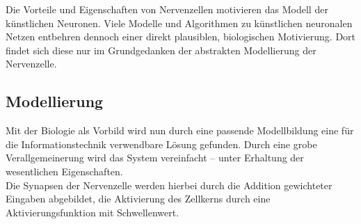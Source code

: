 Die Vorteile und Eigenschaften von Nervenzellen motivieren das Modell der künstlichen Neuronen. Viele Modelle und Algorithmen zu künstlichen neuronalen Netzen entbehren dennoch einer direkt plausiblen, biologischen Motivierung. Dort findet sich diese nur im Grundgedanken der abstrakten Modellierung der Nervenzelle.

\subsection{Modellierung}
Mit der Biologie als Vorbild wird nun durch eine passende Modellbildung eine für die Informationstechnik verwendbare Lösung gefunden. Durch eine grobe Verallgemeinerung wird das System vereinfacht – unter Erhaltung der wesentlichen Eigenschaften.\\
Die Synapsen der Nervenzelle werden hierbei durch die Addition gewichteter Eingaben abgebildet, die Aktivierung des Zellkerns durch eine Aktivierungsfunktion mit Schwellenwert.

